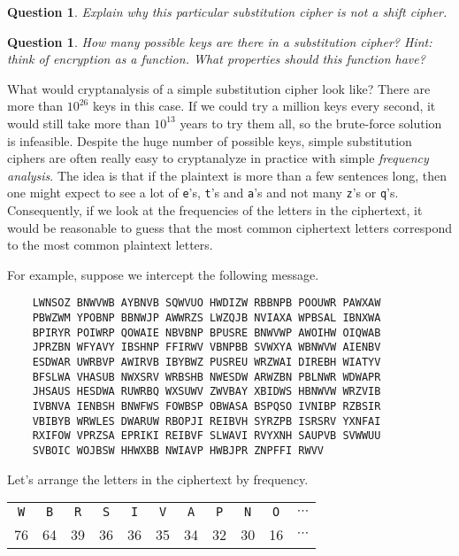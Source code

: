 \documentclass[12pt]{article}
\theoremstyle{plain}
\newtheorem{question}[theorem]{Question}
\theoremstyle{definition}
\theoremstyle{remark}
\begin{document}
\begin{question}
    Explain why this particular substitution cipher is not a shift cipher.
\end{question}

\begin{question}
    How many possible keys are there in a substitution cipher? Hint: think of encryption as a function. What properties should this function have?
\end{question}

What would cryptanalysis of a simple substitution cipher look like?
There are more than $10^{26}$ keys in this case.
If we could try a million keys every second, it would still take more than $10^{13}$ years to try them all, so the brute-force solution is infeasible.
Despite the huge number of possible keys, simple substitution ciphers are often really easy to cryptanalyze in practice with simple \emph{frequency analysis}.
The idea is that if the plaintext is more than a few sentences long, then one might expect to see a lot of \texttt{e}'s, \texttt{t}'s and \texttt{a}'s and not many \texttt{z}'s or \texttt{q}'s.
Consequently, if we look at the frequencies of the letters in the ciphertext, it would be reasonable to guess that the most common ciphertext letters correspond to the most common plaintext letters.

For example, suppose we intercept the following message.

\begin{center}
\begin{BVerbatim}
    LWNSOZ BNWVWB AYBNVB SQWVUO HWDIZW RBBNPB POOUWR PAWXAW
    PBWZWM YPOBNP BBNWJP AWWRZS LWZQJB NVIAXA WPBSAL IBNXWA
    BPIRYR POIWRP QOWAIE NBVBNP BPUSRE BNWVWP AWOIHW OIQWAB
    JPRZBN WFYAVY IBSHNP FFIRWV VBNPBB SVWXYA WBNWVW AIENBV
    ESDWAR UWRBVP AWIRVB IBYBWZ PUSREU WRZWAI DIREBH WIATYV
    BFSLWA VHASUB NWXSRV WRBSHB NWESDW ARWZBN PBLNWR WDWAPR
    JHSAUS HESDWA RUWRBQ WXSUWV ZWVBAY XBIDWS HBNWVW WRZVIB
    IVBNVA IENBSH BNWFWS FOWBSP OBWASA BSPQSO IVNIBP RZBSIR
    VBIBYB WRWLES DWARUW RBOPJI REIBVH SYRZPB ISRSRV YXNFAI
    RXIFOW VPRZSA EPRIKI REIBVF SLWAVI RVYXNH SAUPVB SVWWUU
    SVBOIC WOJBSW HHWXBB NWIAVP HWBJPR ZNPFFI RWVV
\end{BVerbatim}
\end{center}

Let's arrange the letters in the ciphertext by frequency.

\begin{center}
\begin{tabular}{c c c c c c c c c c c}
    \texttt{W} & \texttt{B} & \texttt{R} & \texttt{S} & \texttt{I} & \texttt{V} & \texttt{A} & \texttt{P} & \texttt{N} & \texttt{O} & $\cdots$\\
    76 & 64 & 39 & 36 & 36 & 35 & 34 & 32 & 30 & 16 & $\cdots$
\end{tabular}

\end{center}
\end{document}
